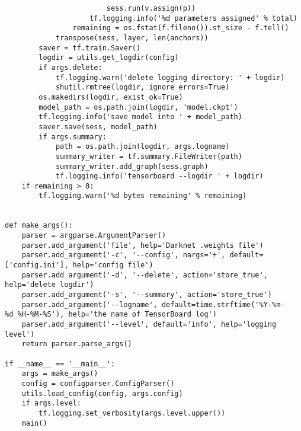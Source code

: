 \begin{lstlisting}
                        sess.run(v.assign(p))
                    tf.logging.info('%d parameters assigned' % total)
                remaining = os.fstat(f.fileno()).st_size - f.tell()
            transpose(sess, layer, len(anchors))
        saver = tf.train.Saver()
        logdir = utils.get_logdir(config)
        if args.delete:
            tf.logging.warn('delete logging directory: ' + logdir)
            shutil.rmtree(logdir, ignore_errors=True)
        os.makedirs(logdir, exist_ok=True)
        model_path = os.path.join(logdir, 'model.ckpt')
        tf.logging.info('save model into ' + model_path)
        saver.save(sess, model_path)
        if args.summary:
            path = os.path.join(logdir, args.logname)
            summary_writer = tf.summary.FileWriter(path)
            summary_writer.add_graph(sess.graph)
            tf.logging.info('tensorboard --logdir ' + logdir)
    if remaining > 0:
        tf.logging.warn('%d bytes remaining' % remaining)


def make_args():
    parser = argparse.ArgumentParser()
    parser.add_argument('file', help='Darknet .weights file')
    parser.add_argument('-c', '--config', nargs='+', default=['config.ini'], help='config file')
    parser.add_argument('-d', '--delete', action='store_true', help='delete logdir')
    parser.add_argument('-s', '--summary', action='store_true')
    parser.add_argument('--logname', default=time.strftime('%Y-%m-%d_%H-%M-%S'), help='the name of TensorBoard log')
    parser.add_argument('--level', default='info', help='logging level')
    return parser.parse_args()

if __name__ == '__main__':
    args = make_args()
    config = configparser.ConfigParser()
    utils.load_config(config, args.config)
    if args.level:
        tf.logging.set_verbosity(args.level.upper())
    main()

\end{lstlisting}

